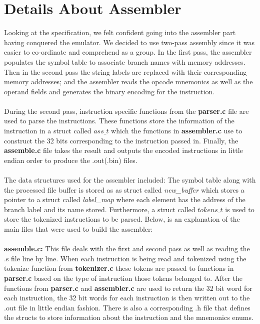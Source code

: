 \documentclass[a4paper]{article}
\begin{document}
\section{Details About Assembler}
Looking at the specification, we felt confident going into the assembler part having conquered the emulator. We decided to use two-pass assembly since it was easier to co-ordinate and comprehend as a group. In the first pass, the assembler populates the symbol table to associate branch names with memory addresses. Then in the second pass the string labels are replaced with their corresponding memory addresses; and the assembler reads the opcode mnemonics as well as the operand fields and generates the binary encoding for the instruction. 
\\\\
During the second pass, instruction specific functions from the \textbf{parser.c} file are used to parse the instructions. These functions store the information of the instruction in a struct called $ass\_t$ which the functions in \textbf{assembler.c} use to construct the 32 bits corresponding to the instruction passed in. Finally, the \textbf{assemble.c} file takes the result and outputs the encoded instructions in little endian order to produce the .out(.bin) files. 
\\\\
The data structures used for the assembler included: The symbol table along with the processed file buffer is stored as as struct called \textit{new\_buffer} which stores a pointer to a struct called \textit{label\_map} where each element has the address of the branch label and its name stored. Furthermore, a struct called $tokens\_t$ is used to store the tokenized instructions to be parsed. Below, is an explanation of the main files that were used to build the assembler:
\\\\
\textbf{assemble.c: } This file deals with the first and second pass as well as reading the .s file line by line. When each instruction is being read and tokenized using the tokenize function from \textbf{tokenizer.c} these tokens are passed to functions in \textbf{parser.c} based on the type of instruction those tokens belonged to. After the functions from \textbf{parser.c} and \textbf{assembler.c} are used to return the 32 bit word for each instruction, the 32 bit words for each instruction is then written out to the .out file in little endian fashion. There is also a corresponding .h file that defines the structs to store information about the instruction and the mnemonics enums. 
\end{document}
